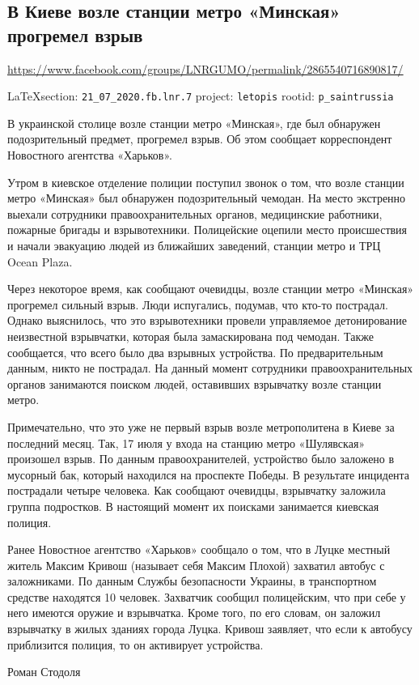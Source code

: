  
 
\subsection{В Киеве возле станции метро «Минская» прогремел взрыв}
\url{https://www.facebook.com/groups/LNRGUMO/permalink/2865540716890817/}
  
\vspace{0.5cm}
{\small\LaTeX section: \verb|21_07_2020.fb.lnr.7| project: \verb|letopis| rootid: \verb|p_saintrussia|}
\vspace{0.5cm}

  
В украинской столице возле станции метро «Минская», где был обнаружен
подозрительный предмет, прогремел взрыв. Об этом сообщает корреспондент
Новостного агентства «Харьков». 

Утром в киевское отделение полиции поступил звонок о том, что возле станции
метро «Минская» был обнаружен подозрительный чемодан. На место экстренно
выехали сотрудники правоохранительных органов, медицинские работники, пожарные
бригады и взрывотехники. Полицейские оцепили место происшествия и начали
эвакуацию людей из ближайших заведений, станции метро и ТРЦ Ocean Plaza. 

Через некоторое время, как сообщают очевидцы, возле станции метро «Минская»
прогремел сильный взрыв. Люди испугались, подумав, что кто-то пострадал. Однако
выяснилось, что это взрывотехники провели управляемое детонирование неизвестной
взрывчатки, которая была замаскирована под чемодан. Также сообщается, что всего
было два взрывных устройства. По предварительным данным, никто не пострадал. На
данный момент сотрудники правоохранительных органов занимаются поиском людей,
оставивших взрывчатку возле станции метро. 

Примечательно, что это уже не первый взрыв возле метрополитена в Киеве за
последний месяц. Так, 17 июля у входа на станцию метро «Шулявская» произошел
взрыв. По данным правоохранителей, устройство было заложено в мусорный бак,
который находился на проспекте Победы. В результате инцидента пострадали четыре
человека. Как сообщают очевидцы, взрывчатку заложила группа подростков. В
настоящий момент их поисками занимается киевская полиция. 

Ранее Новостное агентство «Харьков» сообщало о том, что в Луцке местный житель
Максим Кривош (называет себя Максим Плохой) захватил автобус с заложниками. По
данным Службы безопасности Украины, в транспортном средстве находятся 10
человек. Захватчик сообщил полицейским, что при себе у него имеются оружие и
взрывчатка. Кроме того, по его словам, он заложил взрывчатку в жилых зданиях
города Луцка. Кривош заявляет, что если к автобусу приблизится полиция, то он
активирует устройства. 

Роман Стодоля 
